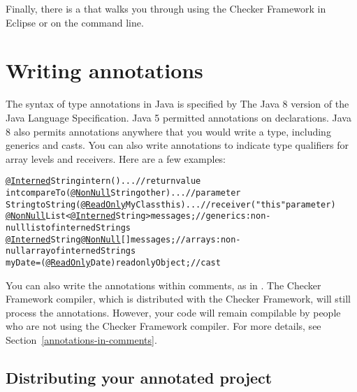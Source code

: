 Finally, there is a 
that walks you through using the Checker Framework in Eclipse or on the
command line.



\section{Writing annotations\label{writing-annotations}}

The syntax of type annotations in Java is specified by
The Java 8 version of the Java Language Specification.
Java 5 permitted annotations on declarations.  Java 8 also permits annotations
anywhere that you would write a type, including generics and casts.  You
can also write annotations to indicate type qualifiers for array levels and
receivers.  Here are a few examples:

\begin{alltt}
  \underline{@Interned} String intern() \ttlcb{} ... \ttrcb{}               // return value
  int compareTo(\underline{@NonNull} String other) \ttlcb{} ... \ttrcb{}    // parameter
  String toString(\underline{@ReadOnly} MyClass this) \ttlcb{} ... \ttrcb{} // receiver ("this" parameter)
  \underline{@NonNull} List<\underline{@Interned} String> messages;       // generics:  non-null list of interned Strings
  \underline{@Interned} String \underline{@NonNull} [] messages;          // arrays:  non-null array of interned Strings
  myDate = (\underline{@ReadOnly} Date) readonlyObject;       // cast
\end{alltt}

You can also write the annotations within comments, as in
.  The Checker Framework compiler, which is
distributed with the Checker Framework, will still process
the annotations.
However, your code will remain compilable by people who are not using the
Checker Framework compiler.  For more details, see
Section~\ref{annotations-in-comments}.



\subsection{Distributing your annotated project\label{distributing}}

